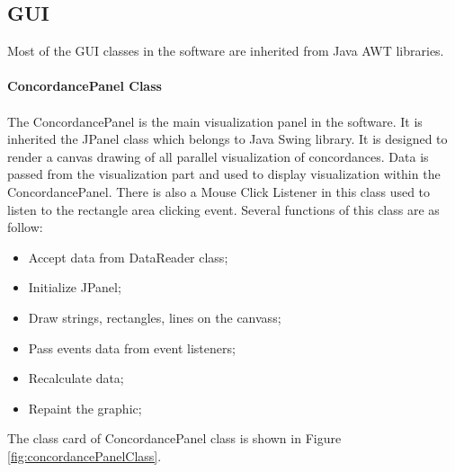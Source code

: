 \subsection{GUI}
Most of the GUI classes in the software are inherited from Java AWT libraries. 
\paragraph{ConcordancePanel Class}
\paragraph[]{}The ConcordancePanel is the main visualization panel in the software. It is inherited the JPanel class which belongs to Java Swing library. It is designed to render a canvas drawing of all parallel visualization of concordances. Data is passed from the visualization part and used to display visualization within the ConcordancePanel. There is also a Mouse Click Listener in this class used to listen to the rectangle area clicking event. Several functions of this class are as follow:
\begin{itemize}
	\item \textbf{}Accept data from DataReader class;
	\item \textbf{}Initialize JPanel;
	\item \textbf{}Draw strings, rectangles, lines on the canvass;
	\item \textbf{}Pass events data from event listeners;
	\item \textbf{}Recalculate data;
	\item \textbf{}Repaint the graphic;
\end{itemize}  
The class card of ConcordancePanel class is shown in Figure \ref{fig:concordancePanelClass}. 

